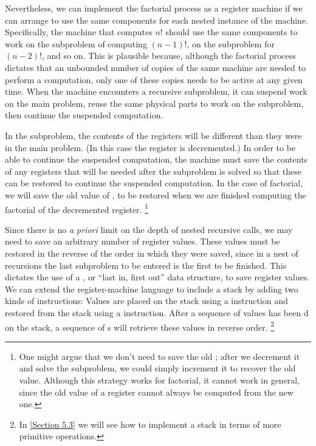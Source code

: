 Nevertheless, we can implement the factorial process as a register machine if we can arrange to use the same components for each nested instance of the machine.
Specifically, the machine that computes \( n! \)  should use the same components to work on the subproblem of computing \( (n - 1)! \), on the subproblem for \( (n - 2)! \), and so on.
This is plausible because, although the factorial process dictates that an unbounded number of copies of the same machine are needed to perform a computation, only one of these copies needs to be active at any given time.
When the machine encounters a recursive subproblem, it can suspend work on the main problem, reuse the same physical parts to work on the subproblem, then continue the suspended computation.

In the subproblem, the contents of the registers will be different than they were in the main problem.
(In this case the  register is decremented.)
In order to be able to continue the suspended computation, the machine must save the contents of any registers that will be needed after the subproblem is solved so that these can be restored to continue the suspended computation.
In the case of factorial, we will save the old value of , to be restored when we are finished computing the factorial of the decremented  register.%
\footnote{
	One might argue that we don’t need to save the old ;
	after we decrement it and solve the subproblem, we could simply increment it to recover the old value.
	Although this strategy works for factorial, it cannot work in general, since the old value of a register cannot always be computed from the new one.
}

Since there is no \emph{a priori} limit on the depth of nested recursive calls, we may need to save an arbitrary number of register values.
These values must be restored in the reverse of the order in which they were saved, since in a nest of recursions the last subproblem to be entered is the first to be finished.
This dictates the use of a , or “last in, first out” data structure, to save register values.
We can extend the register-machine language to include a stack by adding two kinds of instructions:
Values are placed on the stack using a  instruction and restored from the stack using a  instruction.
After a sequence of values has been d on the stack, a sequence of s will retrieve these values in reverse order.%
\footnote{
	In \cref{Section 5.3} we will see how to implement a stack in terms of more primitive operations.
}

